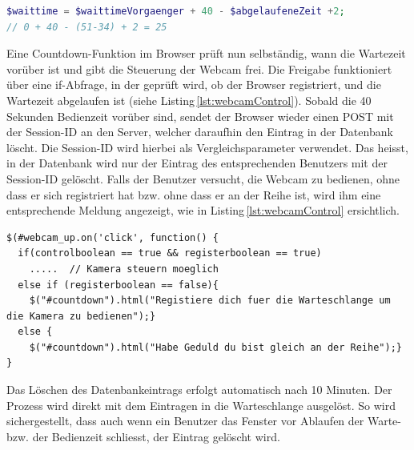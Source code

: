 \begin{lstlisting}[label=lst:wartezeit,caption=Berechnung der Wartezeit, language=PHP, style=PHP]
$waittime = $waittimeVorgaenger + 40 - $abgelaufeneZeit +2;
// 0 + 40 - (51-34) + 2 = 25
\end{lstlisting}
\vspace{3mm}

\noindent
Eine Countdown-Funktion im Browser prüft nun selbständig, wann die Wartezeit vorüber ist und gibt die Steuerung der Webcam frei. Die Freigabe funktioniert über eine if-Abfrage, in der geprüft wird, ob der Browser registriert, und die Wartezeit abgelaufen ist (siehe Listing\,\ref{lst:webcamControl}).
Sobald die 40\,Sekunden Bedienzeit vorüber sind, sendet der Browser wieder einen POST mit der Session-ID an den Server, welcher daraufhin den Eintrag in der Datenbank löscht. Die Session-ID wird hierbei als Vergleichsparameter verwendet. Das heisst, in der Datenbank wird nur der Eintrag des entsprechenden Benutzers mit der Session-ID gelöscht. Falls der Benutzer versucht, die Webcam zu bedienen, ohne dass er sich registriert hat bzw. ohne dass er an der Reihe ist, wird ihm eine entsprechende Meldung angezeigt, wie in Listing\,\ref{lst:webcamControl} ersichtlich.

\vspace{3mm}
\begin{lstlisting}[label=lst:webcamControl, caption=Freigabe der Webcam-Steuerung,language=HTML5, style=htmlcssjs]
$(#webcam_up.on('click', function() {
  if(controlboolean == true && registerboolean == true)
    .....  // Kamera steuern moeglich
  else if (registerboolean == false){
    $("#countdown").html("Registiere dich fuer die Warteschlange um die Kamera zu bedienen");}
  else {
    $("#countdown").html("Habe Geduld du bist gleich an der Reihe");}
}
\end{lstlisting}
\vspace{3mm}

\noindent
Das Löschen des Datenbankeintrags erfolgt automatisch nach 10 Minuten. Der Prozess wird direkt mit dem Eintragen in die Warteschlange ausgelöst. So wird sichergestellt, dass auch wenn ein Benutzer das Fenster vor Ablaufen der Warte- bzw. der Bedienzeit schliesst, der Eintrag gelöscht wird.
